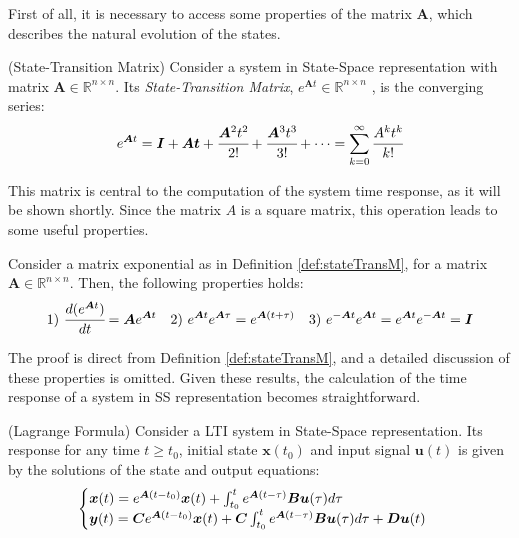 \documentclass[a4paper,11pt]{book}
\numberwithin{figure}{chapter}
\numberwithin{equation}{chapter}
\numberwithin{table}{chapter}
\newtheorem{theorem}{Theorem}[chapter]
\theoremstyle{definition}
\newtheorem{definition}{Definition}[chapter]
\newcounter{boxed-theorem}
\newenvironment{boxed-theorem}[1]
{\begin{shaded} \begin{theorem}{#1}}
{\end{theorem} \end{shaded}}
\newcounter{boxed-definition}
\newenvironment{boxed-definition}[1]
{\begin{shaded} \begin{definition}{#1}}
{\end{definition} \end{shaded}}
\begin{document}
First of all, it is necessary to access some properties of the matrix $\bm{A}$, which describes the natural evolution of the states. 

\begin{boxed-definition}{(State-Transition Matrix)} \label{def:stateTransM}
	Consider a system in State-Space representation with matrix $\bm{A} \in \mathbb{R}^{n \times n}$. Its \textit{State-Transition Matrix}, $e^{\bm{A} t} \in \mathbb{R}^{n \times n}$ , is the converging series:
\begin{equation}
	e^{\bm{A} t} = \bm{I} + \bm{At} + \cfrac{\bm{A}^2 t^2}{2!} + \cfrac{\bm{A}^3 t^3}{3!} + \cdots = \sum_{k=0}^{\infty} \cfrac{A^k t^k}{k!}
\end{equation} 
\end{boxed-definition}

This matrix is central to the computation of the system time response, as it will be shown shortly. Since the matrix $A$ is a square matrix, this operation leads to some useful properties.

\begin{boxed-theorem}{} \label{th:stateTransMProp}
	Consider a matrix exponential as in Definition \ref{def:stateTransM}, for a matrix $\bm{A}  \in \mathbb{R}^{n \times n}$. Then, the following properties holds:
\begin{align}
		1)\ \cfrac{d ( e^{\bm{A} t} )}{dt} = \bm{A} e^{\bm{A} t} & &
		2)\ e^{\bm{A} t} e^{\bm{A} \tau} = e^{\bm{A} (t + \tau)} & &
		3)\ e^{-\bm{A} t} e^{\bm{A} t} = e^{\bm{A} t} e^{-\bm{A} t} = \bm{I}
\end{align}
\end{boxed-theorem}

The proof is direct from Definition \ref{def:stateTransM}, and a detailed discussion of these properties is omitted. Given these results, the calculation of the time response of a system in SS representation becomes straightforward.

\begin{boxed-theorem}{(Lagrange Formula)} \label{th:lagrangeForm}
	Consider a LTI system in State-Space representation. Its response for any time $t \geq t_0$, initial state $\bm{x}(t_0)$ and input signal $\bm{u}(t)$ is given by the solutions of the state and output equations:
	\begin{align}
	\begin{cases}
		\bm{x}(t) = e^{\bm{A}(t - t_0)} \bm{x}(t) + \int_{t_0}^{t} e^{\bm{A}(t - \tau)} \bm{B} \bm{u}(\tau) d \tau \hfill & \\
		\bm{y}(t) = \bm{C} e^{\bm{A}(t - t_0)} \bm{x}(t) + \bm{C} \int_{t_0}^{t} e^{\bm{A}(t - \tau)} \bm{B} \bm{u}(\tau) d \tau + \bm{D} \bm{u}(t) &
	\end{cases}
	\end{align}
\end{boxed-theorem}
\end{document}
